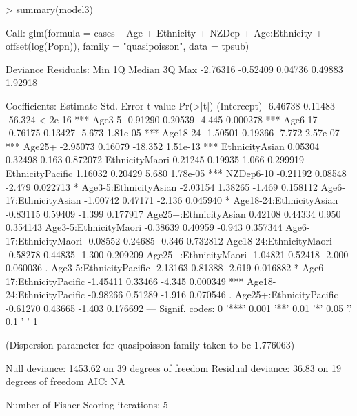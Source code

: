 \documentclass{article}
\begin{document}
\begin{Schunk}
\begin{Sinput}
> summary(model3)
\end{Sinput}
\begin{Soutput}
Call:
glm(formula = cases ~ Age + Ethnicity + NZDep + Age:Ethnicity + 
    offset(log(Popn)), family = "quasipoisson", data = tpsub)

Deviance Residuals: 
     Min        1Q    Median        3Q       Max  
-2.76316  -0.52409   0.04736   0.49883   1.92918  

Coefficients:
                          Estimate Std. Error t value Pr(>|t|)    
(Intercept)               -6.46738    0.11483 -56.324  < 2e-16 ***
Age3-5                    -0.91290    0.20539  -4.445 0.000278 ***
Age6-17                   -0.76175    0.13427  -5.673 1.81e-05 ***
Age18-24                  -1.50501    0.19366  -7.772 2.57e-07 ***
Age25+                    -2.95073    0.16079 -18.352 1.51e-13 ***
EthnicityAsian             0.05304    0.32498   0.163 0.872072    
EthnicityMaori             0.21245    0.19935   1.066 0.299919    
EthnicityPacific           1.16032    0.20429   5.680 1.78e-05 ***
NZDep6-10                 -0.21192    0.08548  -2.479 0.022713 *  
Age3-5:EthnicityAsian     -2.03154    1.38265  -1.469 0.158112    
Age6-17:EthnicityAsian    -1.00742    0.47171  -2.136 0.045940 *  
Age18-24:EthnicityAsian   -0.83115    0.59409  -1.399 0.177917    
Age25+:EthnicityAsian      0.42108    0.44334   0.950 0.354143    
Age3-5:EthnicityMaori     -0.38639    0.40959  -0.943 0.357344    
Age6-17:EthnicityMaori    -0.08552    0.24685  -0.346 0.732812    
Age18-24:EthnicityMaori   -0.58278    0.44835  -1.300 0.209209    
Age25+:EthnicityMaori     -1.04821    0.52418  -2.000 0.060036 .  
Age3-5:EthnicityPacific   -2.13163    0.81388  -2.619 0.016882 *  
Age6-17:EthnicityPacific  -1.45411    0.33466  -4.345 0.000349 ***
Age18-24:EthnicityPacific -0.98266    0.51289  -1.916 0.070546 .  
Age25+:EthnicityPacific   -0.61270    0.43665  -1.403 0.176692    
---
Signif. codes:  0 '***' 0.001 '**' 0.01 '*' 0.05 '.' 0.1 ' ' 1

(Dispersion parameter for quasipoisson family taken to be 1.776063)

    Null deviance: 1453.62  on 39  degrees of freedom
Residual deviance:   36.83  on 19  degrees of freedom
AIC: NA

Number of Fisher Scoring iterations: 5
\end{Soutput}
\end{Schunk}
\end{document}
